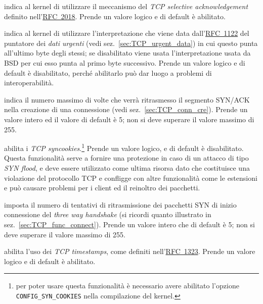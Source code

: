 \begin{basedescript}{\desclabelwidth{2.2cm}\desclabelstyle{\nextlinelabel}}
\item[\sysctlrelfiled{net/ipv4}{tcp\_sack}] indica al kernel di
  utilizzare il meccanismo del \textit{TCP selective acknowledgement} definito
  nell'\href{http://www.ietf.org/rfc/rfc2018.txt}{RFC~2018}. Prende un valore
  logico e di default è abilitato.

\item[\sysctlrelfiled{net/ipv4}{tcp\_stdurg}] indica al kernel di
  utilizzare l'interpretazione che viene data
  dall'\href{http://www.ietf.org/rfc/rfc1122.txt}{RFC~1122} del puntatore dei
  \textit{dati urgenti} (vedi sez.~\ref{sec:TCP_urgent_data}) in cui questo
  punta all'ultimo byte degli stessi; se disabilitato viene usata
  l'interpretazione usata da BSD per cui esso punta al primo byte successivo.
  Prende un valore logico e di default è disabilitato, perché abilitarlo può
  dar luogo a problemi di interoperabilità.

\item[\sysctlrelfiled{net/ipv4}{tcp\_synack\_retries}] indica il numero
  massimo di volte che verrà ritrasmesso il segmento SYN/ACK nella creazione di
  una connessione (vedi sez.~\ref{sec:TCP_conn_cre}). Prende un valore intero
  ed il valore di default è 5; non si deve superare il valore massimo di 255.

\item[\sysctlrelfiled{net/ipv4}{tcp\_syncookies}] abilita i \textit{TCP
    syncookies}.\footnote{per poter usare questa funzionalità è necessario
    avere abilitato l'opzione \texttt{CONFIG\_SYN\_COOKIES} nella compilazione
    del kernel.} Prende un valore logico, e di default è disabilitato. Questa
  funzionalità serve a fornire una protezione in caso di un attacco di tipo
  \textit{SYN flood}, e deve essere utilizzato come ultima risorsa dato che
  costituisce una violazione del protocollo TCP e confligge con altre
  funzionalità come le estensioni e può causare problemi per i client ed il
  reinoltro dei pacchetti.

\item[\sysctlrelfiled{net/ipv4}{tcp\_syn\_retries}] imposta il numero di
  tentativi di ritrasmissione dei pacchetti SYN di inizio connessione del
  \textit{three way handshake} (si ricordi quanto illustrato in
  sez.~\ref{sec:TCP_func_connect}). Prende un valore intero che di default è
  5; non si deve superare il valore massimo di 255.

\item[\sysctlrelfiled{net/ipv4}{tcp\_timestamps}] abilita l'uso dei
  \textit{TCP timestamps}, come definiti
  nell'\href{http://www.ietf.org/rfc/rfc1323.txt}{RFC~1323}. Prende un valore
  logico e di default è abilitato.


\end{basedescript}
